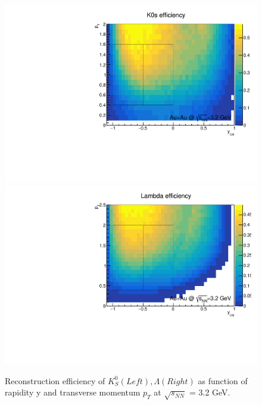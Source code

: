 \begin{figure}[hbt!]
\centering
\includegraphics[width=0.45\linewidth]{figures/chapter02/3p2_K0s_eff.pdf}
\includegraphics[width=0.45\linewidth]{figures/chapter02/3p2_lambda_eff.pdf}
\caption{Reconstruction efficiency of $K^{0}_{S}(Left), \Lambda(Right)$ as function of rapidity y and transverse momentum $p_T$ at $\sqrt{s_{NN}}$ = 3.2 GeV.}
\label{fig:3p2_K0sLam_eff}
\end{figure}


